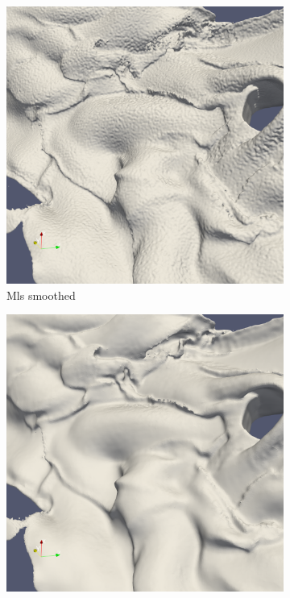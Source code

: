 \begin{figure}
	\begin{center}
		\begin{subfigure}[b]{0.47\textwidth}
			\includegraphics[width=\textwidth]{figures/CanionOriginal3.png}
			\caption{Mls smoothed}
		\end{subfigure}
		\begin{subfigure}[b]{0.47\textwidth}
			\includegraphics[width=\textwidth]{figures/CanionMls3.png}

\end{subfigure}
\end{center}
\end{figure}
